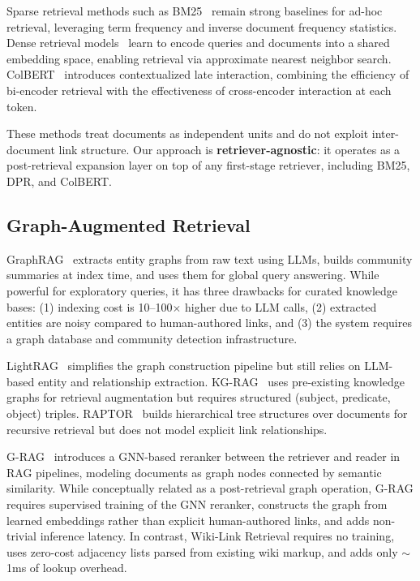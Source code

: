 \documentclass[sigconf,review]{acmart}
\newcommand{\sys}{Wiki-Link Retrieval\xspace}
\begin{document}
Sparse retrieval methods such as BM25~\citep{robertson1994bm25} remain strong baselines for
ad-hoc retrieval, leveraging term frequency and inverse document frequency
statistics. Dense retrieval models~\citep{karpukhin2020dpr,xiong2021ance} learn to encode
queries and documents into a shared embedding space, enabling retrieval via
approximate nearest neighbor search. ColBERT~\citep{khattab2020colbert} introduces
contextualized late interaction, combining the efficiency of bi-encoder
retrieval with the effectiveness of cross-encoder interaction at each token.

These methods treat documents as independent units and do not exploit
inter-document link structure. Our approach is \textbf{retriever-agnostic}:
it operates as a post-retrieval expansion layer on top of any first-stage
retriever, including BM25, DPR, and ColBERT.

\subsection{Graph-Augmented Retrieval}

GraphRAG~\citep{graphrag2024} extracts entity graphs from raw text using LLMs, builds
community summaries at index time, and uses them for global query answering.
While powerful for exploratory queries, it has three drawbacks for curated
knowledge bases: (1) indexing cost is 10--100$\times$ higher due to LLM calls,
(2) extracted entities are noisy compared to human-authored links, and
(3) the system requires a graph database and community detection infrastructure.

LightRAG~\citep{lighthrag} simplifies the graph construction pipeline but still relies
on LLM-based entity and relationship extraction. KG-RAG~\citep{kgrag2024} uses
pre-existing knowledge graphs for retrieval augmentation but requires
structured (subject, predicate, object) triples. RAPTOR~\citep{raptor2024}
builds hierarchical tree structures over documents for recursive retrieval
but does not model explicit link relationships.

G-RAG~\citep{grag2024} introduces a GNN-based reranker between the retriever and
reader in RAG pipelines, modeling documents as graph nodes connected by semantic
similarity. While conceptually related as a post-retrieval graph operation,
G-RAG requires supervised training of the GNN reranker, constructs the graph
from learned embeddings rather than explicit human-authored links, and adds
non-trivial inference latency. In contrast, \sys requires no training,
uses zero-cost adjacency lists parsed from existing wiki markup, and adds
only ${\sim}$1ms of lookup overhead.
\end{document}
